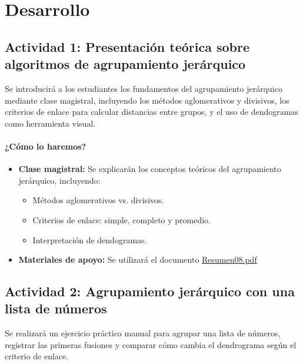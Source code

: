 \documentclass[a4,11pt]{aleph-notas}
\begin{document}
\section*{Desarrollo}

\subsection*{Actividad 1: Presentación teórica sobre algoritmos de agrupamiento jerárquico}

Se introducirá a los estudiantes los fundamentos del agrupamiento jerárquico mediante clase magistral, incluyendo los métodos aglomerativos y divisivos, los criterios de enlace para calcular distancias entre grupos, y el uso de dendogramas como herramienta visual.

\paragraph{¿Cómo lo haremos?}  
\begin{itemize}[leftmargin=*]
    \item \textbf{Clase magistral:}  
    Se explicarán los conceptos teóricos del agrupamiento jerárquico, incluyendo:
    \begin{itemize}
        \item Métodos aglomerativos vs. divisivos.
        \item Criterios de enlace: simple, completo y promedio.
        \item Interpretación de dendogramas.
    \end{itemize}

    \item \textbf{Materiales de apoyo:} 
    Se utilizará el documento \href{https://andres-merino.github.io/AprendizajeAutomaticoInicial-05-N0105/2-Resumenes/Resumen08.pdf}{Resumen08.pdf}
    
\end{itemize}

\subsection*{Actividad 2: Agrupamiento jerárquico con una lista de números}

Se realizará un ejercicio práctico manual para agrupar una lista de números, registrar las primeras fusiones y comparar cómo cambia el dendrograma según el criterio de enlace.
\end{document}
